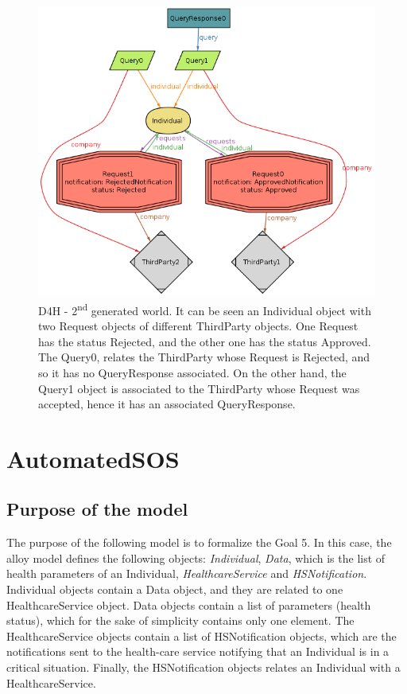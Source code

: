 \documentclass[a4paper, hidelinks, 12pt]{report}
\begin{document}
	\begin{figure}[H]
		\centering
		\includegraphics[scale=0.55]{Diagrams/goal_2_world_2.png}
		\caption[D4H - Second generated world]{D4H - 2\textsuperscript{nd} generated world. It can be seen an Individual object with two Request objects of different ThirdParty objects. One Request has the status Rejected, and the other one has the status Approved. The Query0, relates the ThirdParty whose Request is Rejected, and so it has no QueryResponse associated. On the other hand, the Query1 object is associated to the ThirdParty whose Request was accepted, hence it has an associated QueryResponse.}
		\label{fig:goal_2_world_2}
	\end{figure}
	
	\section{AutomatedSOS}
	\subsection{Purpose of the model}
	The purpose of the following model is to formalize the Goal 5. In this case, the alloy model defines the following objects: \textit{Individual}, \textit{Data}, which is the list of health parameters of an Individual, \textit{HealthcareService} and \textit{HSNotification}. Individual objects contain a Data object, and they are related to one HealthcareService object. Data objects contain a list of parameters (health status), which for the sake of simplicity contains only one element. The HealthcareService objects contain a list of HSNotification objects, which are the notifications sent to the health-care service notifying that an Individual is in a critical situation. Finally, the HSNotification objects relates an Individual with a HealthcareService.\\
\end{document}
